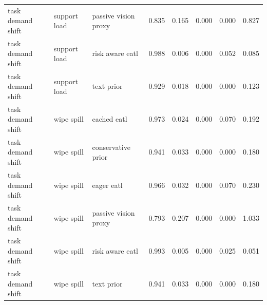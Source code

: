 \begin{longtable}{lllrrrrr}
task demand shift & support load & passive vision proxy & 0.835 & 0.165 & 0.000 & 0.000 & 0.827 \\
task demand shift & support load & risk aware eatl & 0.988 & 0.006 & 0.000 & 0.052 & 0.085 \\
task demand shift & support load & text prior & 0.929 & 0.018 & 0.000 & 0.000 & 0.123 \\
\midrule
task demand shift & wipe spill & cached eatl & 0.973 & 0.024 & 0.000 & 0.070 & 0.192 \\
task demand shift & wipe spill & conservative prior & 0.941 & 0.033 & 0.000 & 0.000 & 0.180 \\
task demand shift & wipe spill & eager eatl & 0.966 & 0.032 & 0.000 & 0.070 & 0.230 \\
task demand shift & wipe spill & passive vision proxy & 0.793 & 0.207 & 0.000 & 0.000 & 1.033 \\
task demand shift & wipe spill & risk aware eatl & 0.993 & 0.005 & 0.000 & 0.025 & 0.051 \\
task demand shift & wipe spill & text prior & 0.941 & 0.033 & 0.000 & 0.000 & 0.180 \\
\bottomrule
\end{longtable}
